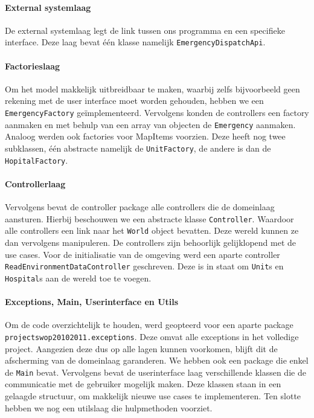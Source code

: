 \paragraph{External systemlaag}
De external systemlaag legt de link tussen ons programma en een specifieke interface. Deze laag bevat \'e\'en klasse namelijk \texttt{EmergencyDispatchApi}.
\paragraph{Factorieslaag}
Om het model makkelijk uitbreidbaar te maken, waarbij zelfs bijvoorbeeld geen rekening met de user interface moet worden gehouden, hebben we een \texttt{EmergencyFactory} ge\"implementeerd. Vervolgens konden de controllers een factory aanmaken en met behulp van een array van objecten de \texttt{Emergency} aanmaken. Analoog werden ook factories voor MapItems voorzien. Deze heeft nog twee subklassen, \'e\'en abstracte namelijk de \texttt{UnitFactory}, de andere is dan de \texttt{HopitalFactory}. 
\paragraph{Controllerlaag}
Vervolgens bevat de controller package alle controllers die de domeinlaag aansturen. Hierbij beschouwen we een abstracte klasse \texttt{Controller}. Waardoor alle controllers een link naar het \texttt{World} object bevatten. Deze wereld kunnen ze dan vervolgens manipuleren. De controllers zijn behoorlijk gelijklopend met de use cases. Voor de initialisatie van de omgeving werd een aparte controller \texttt{ReadEnvironmentDataController} geschreven. Deze is in staat om \texttt{Unit}s en \texttt{Hospital}s aan de wereld toe te voegen.
\paragraph{Exceptions, Main, Userinterface en Utils}
Om de code overzichtelijk te houden, werd geopteerd voor een aparte package \texttt{projectswop20102011.exceptions}. Deze omvat alle exceptions in het volledige project. Aangezien deze dus op alle lagen kunnen voorkomen, blijft dit de afscherming van de domeinlaag garanderen. We hebben ook een package die enkel de \texttt{Main} bevat. Vervolgens bevat de userinterface laag verschillende klassen die de communicatie met de gebruiker mogelijk maken. Deze klassen staan in een gelaagde structuur, om makkelijk nieuwe use cases te implementeren. Ten slotte hebben we nog een utilslaag die hulpmethoden voorziet.